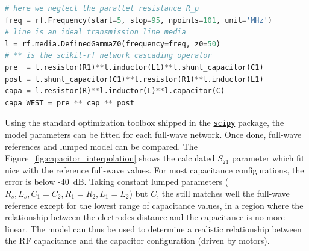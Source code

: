 {\begin{lstlisting}[language=Python]
# here we neglect the parallel resistance R_p
freq = rf.Frequency(start=5, stop=95, npoints=101, unit='MHz')
# line is an ideal transmission line media
l = rf.media.DefinedGammaZ0(frequency=freq, z0=50)  
# ** is the scikit-rf network cascading operator
pre  = l.resistor(R1)**l.inductor(L1)**l.shunt_capacitor(C1)
post = l.shunt_capacitor(C1)**l.resistor(R1)**l.inductor(L1)
capa = l.resistor(R)**l.inductor(L)**l.capacitor(C)
capa_WEST = pre ** cap ** post  
\end{lstlisting}

Using the standard optimization toolbox shipped in the \href{https://www.scipy.org/}{\texttt{scipy}} package, the model parameters can be fitted for each full-wave network. Once done, full-wave references and lumped model can be compared. The Figure~\ref{fig:capacitor_interpolation} shows the calculated $S_{21}$ parameter which fit nice with the reference full-wave values. For most capacitance configurations, the error is below -40~dB. Taking constant lumped parameters ($R_s, L_s, C_1=C_2, R_1=R_2, L_1=L_2$) but $C$, the still matches well the full-wave reference except for the lowest range of capacitance values, in a region where the relationship between the electrodes distance and the capacitance is no more linear. The model can thus be used to determine a realistic relationship between the RF capacitance and the capacitor configuration (driven by motors).

}

